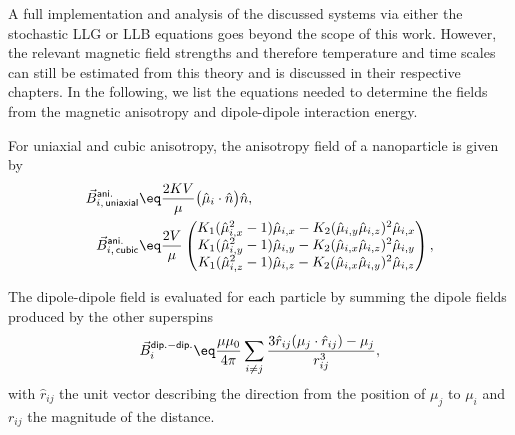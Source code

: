 \documentclass[\main/dresen_thesis.tex]{subfiles}
\begin{document}
      A full implementation and analysis of the discussed systems via either the stochastic LLG or LLB equations goes beyond the scope of this work.
      However, the relevant magnetic field strengths and therefore temperature and time scales can still be estimated from this theory and is discussed in their respective chapters.
      In the following, we list the equations needed to determine the fields from the magnetic anisotropy and dipole-dipole interaction energy.

      For uniaxial and cubic anisotropy, the anisotropy field of a nanoparticle is given by
      \begin{align}
        \vec{B}^\mathsf{ani.}_{i, \,\mathsf{uniaxial}} &\eq \frac{2 K V}{\mu} \bigl( \hat{\mu}_i \cdot \hat{n} \bigr) \hat{n},\\
        \vec{B}^\mathsf{ani.}_{i, \,\mathsf{cubic}} &\eq \frac{2 V}{\mu} \begin{pmatrix}
          K_1 (\hat{\mu}_{i, x}^2 - 1) \hat{\mu}_{i, x} - K_2 (\hat{\mu}_{i, y} \hat{\mu}_{i, z})^2 \hat{\mu}_{i, x} \\
          K_1 (\hat{\mu}_{i, y}^2 - 1) \hat{\mu}_{i, y} - K_2 (\hat{\mu}_{i, x} \hat{\mu}_{i, z})^2 \hat{\mu}_{i, y} \\
          K_1 (\hat{\mu}_{i, z}^2 - 1) \hat{\mu}_{i, z} - K_2 (\hat{\mu}_{i, x} \hat{\mu}_{i, y})^2 \hat{\mu}_{i, z}
        \end{pmatrix},
      \end{align}

      The dipole-dipole field is evaluated for each particle by summing the dipole fields produced by the other superspins
      \begin{align}
        \vec{B}^\mathsf{dip.-dip.}_i \eq \frac{\mu \mu_0}{4 \pi}  \sum_{i \neq j} \frac{3 \hat{r}_{ij}  (\mu_j \cdot \hat{r}_{ij}) - \mu_j}{r_{ij}^3},
      \end{align}
      with $\hat{r}_{ij}$ the unit vector describing the direction from the position of $\mu_j$ to $\mu_i$ and $r_{ij}$ the magnitude of the distance.
\end{document}
